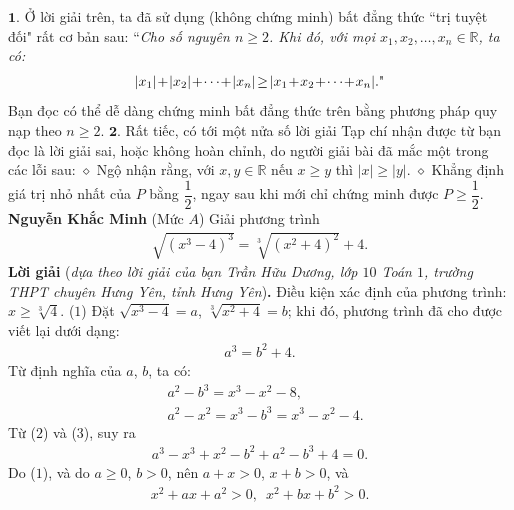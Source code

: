 \begin{multicols}{2}
	\vskip 0.05cm
	$\pmb{1.}$ Ở lời giải trên, ta đã sử dụng (không chứng minh) bất đẳng thức ``trị tuyệt đối" rất cơ bản sau:
	\vskip 0.05cm
	``\textit{Cho số nguyên $n \ge 2$. Khi đó, với mọi  $x_1, x_2, \ldots,x_n \in \mathbb{R}$, ta có:}
	\begin{align*}
		|{x_1}| \!+\! |{x_2}| \!+\!  \cdots  \!+\! |{x_n}| \!\ge\! |{x_1} \!+\! {x_2} \!+\!  \cdots  \!+\! {x_n}|. \text{\color{black}"}
	\end{align*}
	Bạn đọc có thể dễ dàng chứng minh bất đẳng thức trên bằng phương pháp quy nạp theo $n \ge 2$.
	\vskip 0.05cm
	$\pmb{2.}$ Rất tiếc, có tới một nửa số lời giải Tạp chí nhận được từ bạn đọc là lời giải sai, hoặc không hoàn chỉnh, do người giải bài đã mắc một trong các lỗi sau:
	\vskip 0.05cm
	$\diamond$ Ngộ nhận rằng, với  $x,y \in \mathbb{R}$ nếu $x \ge y$ thì $|x|\ge |y|$.
	\vskip 0.05cm 
	$\diamond$ Khẳng định giá trị nhỏ nhất của $P$ bằng  $\dfrac{1}{2}$, ngay sau khi mới chỉ chứng minh được  $P \ge \dfrac{1}{2}$.
	\vskip 0.05cm
	\hfill	\textbf{\color{thachthuctoanhoc}Nguyễn Khắc Minh}
	\vskip 0.05cm
	{}
	(Mức $A$) Giải phương trình
	\begin{align*}
		\sqrt{(x^3-4)^3}=\sqrt[3]{(x^2+4)^2}+4.
	\end{align*} 
	\textbf{\color{thachthuctoanhoc}Lời giải} (\textit{dựa theo lời giải của bạn Trần Hữu Dương, lớp $10$ Toán $1$, trường THPT chuyên Hưng Yên, tỉnh Hưng Yên})\textbf{\color{thachthuctoanhoc}.}
	\vskip 0.05cm
	Điều kiện xác định của phương trình:\linebreak $x \ge \sqrt[3]{4}$. \hfill ($1$)
	\vskip 0.05cm
	Đặt $\sqrt {{x^3} - 4}  = a$,   $\sqrt[3]{{{x^2} + 4}} = b$; khi đó, phương trình đã cho được viết lại dưới dạng:
	\begin{align*}
		{a^3} = {b^2} + 4. \tag{$2$}
	\end{align*}
	Từ định nghĩa của $a$, $b$, ta có:
	\begin{align*}
		&{a^2} - {b^3} = {x^3} - {x^2} - 8, \tag{$3$}\\
		&{a^2} - {x^2} = {x^3} - {b^3} = {x^3} - {x^2} - 4.\tag{$4$}
	\end{align*}
	Từ ($2$) và ($3$), suy ra
	\begin{align*}
		{a^3} - {x^3} + {x^2} - {b^2} + {a^2} - {b^3} + 4 = 0. \tag{$5$}
	\end{align*}
	Do ($1$), và do $a \ge 0$, $b > 0$, nên $a + x > 0$, $x + b > 0$, và
	\begin{align*}
		{x^2} + ax + {a^2} > 0,\,\,\, {x^2} + bx + {b^2} > 0.

\end{align*}
\end{multicols}
